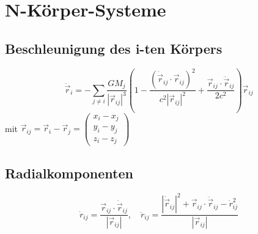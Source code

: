 \section{N-Körper-Systeme}
\subsection{Beschleunigung des i-ten Körpers}
\[
\ddot{\vec{r}}_i = -\sum_{j\neq i} \frac{GM_j}{|\vec{r}_{ij}|^3} \left(
1 - \frac{(\dot{\vec{r}}_{ij}\cdot\vec{r}_{ij})^2}{c^2|\vec{r}_{ij}|^2} + 
\frac{\vec{r}_{ij}\cdot\ddot{\vec{r}}_{ij}}{2c^2}
\right) \vec{r}_{ij}
\]
mit \(\vec{r}_{ij} = \vec{r}_i - \vec{r}_j = \begin{pmatrix} x_i-x_j \\ y_i-y_j \\ z_i-z_j \end{pmatrix}\)

\subsection{Radialkomponenten}
\[
\dot{r}_{ij} = \frac{\vec{r}_{ij}\cdot\dot{\vec{r}}_{ij}}{|\vec{r}_{ij}|}, \quad
\ddot{r}_{ij} = \frac{|\dot{\vec{r}}_{ij}|^2 + \vec{r}_{ij}\cdot\ddot{\vec{r}}_{ij} - \dot{r}_{ij}^2}{|\vec{r}_{ij}|}
\]